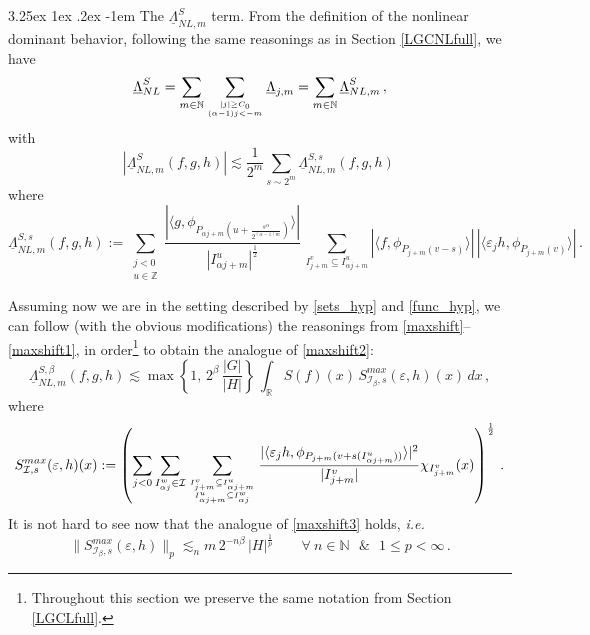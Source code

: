\documentclass[a4paper,reqno]{amsart}
\makeatletter
\renewcommand\paragraph{\@startsection{paragraph}{4}{\z@}%
	{3.25ex \@plus1ex \@minus.2ex}%
	{-1em}%
	{\normalfont\normalsize\bfseries}}
\numberwithin{equation}{section}
\theoremstyle{definition}
\newcommand{\R}{\mathbb{R}}
\newcommand{\Z}{\mathbb{Z}}
\newcommand{\N}{\mathbb{N}}
\newcommand{\e}{\varepsilon}
\newcommand{\uL}{\underline{\Lambda}}
\def\a{\alpha}
\def\b{\beta}
\def\I{\mathcal{I}}
\makeatother
\begin{document}
\paragraph{The $\uL^{S}_{NL,m}$ term.}\label{SNLm-range} From the definition of the nonlinear dominant behavior, following the same reasonings as in Section \ref{LGCNLfull},  we have
\begin{equation}
	\uL^{S}_{NL}=\sum_{m\in\N} \sum_{{|j|\geq C_0}\atop{(\a-1)j<-m}} \uL_{j,m}=\sum_{m\in\N}\uL^{S}_{NL,m}\,,
\end{equation}
with
\begin{equation*}
	|\uL_{NL,m}^S(f,g,h)|\lesssim\frac1{2^m}\sum_{s\sim 2^m}\uL_{NL,m}^{S,s}(f,g,h)\,
\end{equation*}
where
\begin{equation*}
\uL_{NL,m}^{S,s}(f,g,h):=\sum_{\substack{j<0\\u\in\Z}}
	\frac{|\langle g,  \phi_{P_{\a j+m}(u+\frac{s^{\a}}{2^{(\a-1) m}})}\rangle|}{|I_{\a j+m}^u|^{\frac{1}{2}}}\,\sum_{I_{j+m}^v\subseteq I_{\a j+ m}^u}
	|\langle f,  \phi_{P_{j+m}(v-s)}\rangle|\,|\langle \e_j h,  \phi_{P_{j+m}(v)}\rangle|\,.
\end{equation*}

Assuming now we are in the setting described by \eqref{sets_hyp} and \eqref{func_hyp}, we can follow (with the obvious modifications) the reasonings from \eqref{maxshift}--\eqref{maxshift1}, in order\footnote{Throughout this section we preserve the same notation from Section \ref{LGCLfull}.} to obtain the analogue of \eqref{maxshift2}:
\begin{equation}\label{maxshift2A}
\uL^{S,\b}_{NL,m}(f,g,h)\lesssim \max\left\{1,\,2^{\b}\,\frac{|G|}{|H|}\right\}\,\int_{\R} S(f)(x)\,S_{\I_{\b},s}^{max}(\e,h)(x)\,dx\,,
\end{equation}
where
\begin{equation}\label{maxshiftA}
S_{\I,s}^{max}(\e,h)(x):=\left(\sum_{j<0}\sum_{I_{\a j}^w\in \I}
\sum_{{I_{j+m}^v\subseteq I_{\a j+ m}^u}\atop{I_{\a j+ m}^u}\subseteq I_{\a j}^w}
\frac{|\langle \e_j h,  \phi_{P_{j+m}(v+s(I_{\a j+ m}^u))}\rangle|^2}{|I_{j+m}^v|}\chi_{I_{j+m}^v}(x)\right)^{\frac{1}{2}}\,.
\end{equation}
It is not hard to see now that the analogue of \eqref{maxshift3} holds, \textit{i.e.}
\begin{equation}\label{maxshift3A}
\|S_{\I_{\b},s}^{max}(\e,h)\|_{p}\lesssim_{n} m\, 2^{-n\b}\,|H|^{\frac{1}{p}}\qquad\forall\:n\in\N\:\:\:\&\:\:\:1\leq p<\infty\,.
\end{equation}
\end{document}
